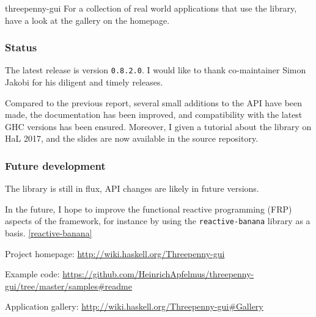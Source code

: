 \begin{hcarentry}[updated]{threepenny-gui}
For a collection of real world applications that use the library, have a look
at the gallery on the homepage.

\subsubsection*{Status}

The latest release is version \verb`0.8.2.0`. I would like to thank co-maintainer Simon Jakobi for his diligent and timely releases.

Compared to the previous report, several small additions to the API have been made, the documentation has been improved, and compatibility with the latest GHC versions has been ensured. Moreover, I given a tutorial about the library on HaL 2017, and the slides are now available in the source repository.

\subsubsection*{Future development}

The library is still in flux, API changes are likely in future versions.

In the future, I hope to improve the functional reactive programming (FRP) aspects of the framework, for instance by using the \verb`reactive-banana` library as a basis. \cref{reactive-banana}

\FurtherReading
\begin{compactitem}
\item Project homepage: \url{http://wiki.haskell.org/Threepenny-gui}
\item Example code:
  \url{https://github.com/HeinrichApfelmus/threepenny-gui/tree/master/samples#readme}
\item Application gallery: \url{http://wiki.haskell.org/Threepenny-gui#Gallery}
\end{compactitem}
\end{hcarentry}
